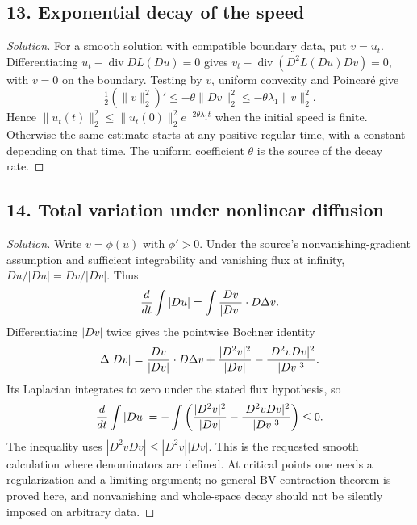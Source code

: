 \subsection*{13. Exponential decay of the speed}
\begin{proof}[Solution]
For a smooth solution with compatible boundary data, put $v=u_t$.
Differentiating $u_t-\operatorname{div}DL(Du)=0$ gives
$v_t-\operatorname{div}(D^2L(Du)Dv)=0$, with $v=0$ on the boundary.
Testing by $v$, uniform convexity and Poincar\'e give
\[
 \tfrac12(\|v\|_2^2)'\leq-\theta\|Dv\|_2^2
 \leq-\theta\lambda_1\|v\|_2^2.
\]
Hence $\|u_t(t)\|_2^2\leq\|u_t(0)\|_2^2e^{-2\theta\lambda_1t}$
when the initial speed is finite. Otherwise the same estimate starts
at any positive regular time, with a constant depending on that time.
The uniform coefficient $\theta$ is the source of the decay rate.
\end{proof}

\subsection*{14. Total variation under nonlinear diffusion}
\begin{proof}[Solution]
Write $v=\phi(u)$ with $\phi'>0$. Under the source's nonvanishing-gradient
assumption and sufficient integrability and vanishing flux at infinity,
$Du/|Du|=Dv/|Dv|$. Thus
\[
 {d\over dt}\int|Du|=\int{Dv\over|Dv|}\cdot D\Delta v.
\]
Differentiating $|Dv|$ twice gives the pointwise Bochner identity
\[
 \Delta|Dv|={Dv\over|Dv|}\cdot D\Delta v
 +{|D^2v|^2\over|Dv|}-{|D^2vDv|^2\over|Dv|^3}.
\]
Its Laplacian integrates to zero under the stated flux hypothesis, so
\[
 {d\over dt}\int|Du|
 =-\int\left({|D^2v|^2\over|Dv|}
       -{|D^2vDv|^2\over|Dv|^3}\right)\leq0.
\]
The inequality uses $|D^2vDv|\leq|D^2v||Dv|$.
This is the requested smooth calculation where denominators are defined.
At critical points one needs a regularization and a limiting argument;
no general BV contraction theorem is proved here, and nonvanishing and
whole-space decay should not be silently imposed on arbitrary data.
\end{proof}
